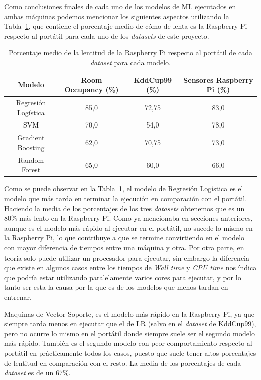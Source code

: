 \documentclass[a4paper, 12pt]{book}
\begin{document}
Como conclusiones finales de cada uno de los modelos de ML ejecutados en ambas máquinas podemos mencionar los siguientes aspectos utilizando la Tabla~\ref{tab:mean_per}, que contiene el porcentaje medio de cómo de lenta es la Raspberry Pi respecto al portátil para cada uno de los \textit{datasets} de este proyecto.

\begin{table}[htb]
\renewcommand{\arraystretch}{1.5}
\begin{adjustbox}{width=\textwidth}
\centering
    \begin{tabular}{c  c  c  c}
    \toprule
    Modelo & Room Occupancy (\%) & KddCup99 (\%) & Sensores Raspberry Pi (\%)\\
    \midrule
     Regresión Logística & 85,0 & 72,75 & 83,0\\
     SVM & 70,0 & 54,0 & 78,0\\
     Gradient Boosting & 62,0 & 70,75 & 73,0\\
     Random Forest & 65,0 & 60,0 & 66,0\\
    \bottomrule
    \end{tabular}
\end{adjustbox}
\caption{Porcentaje medio de la lentitud de la Raspberry Pi respecto al portátil de cada \textit{dataset} para cada modelo.}
\label{tab:mean_per}
\end{table}

Como se puede observar en la Tabla~\ref{tab:mean_per}, el modelo de Regresión Logística es el modelo que más tarda en terminar la ejecución en comparación con el portátil. Haciendo la media de los porcentajes de los tres \textit{datasets} obtenemos que es un $80\%$ más lento en la Raspberry Pi. Como ya mencionaba en secciones anteriores, aunque es el modelo más rápido al ejecutar en el portátil, no sucede lo mismo en la Raspberry Pi, lo que contribuye a que se termine convirtiendo en el modelo con mayor diferencia de tiempos entre una máquina y otra. Por otra parte, en teoría solo puede utilizar un procesador para ejecutar, sin embargo la diferencia que existe en algunos casos entre los tiempos de \textit{Wall time} y \textit{CPU time} nos índica que podría estar utilizando paralelamente varios cores para ejecutar, y por lo tanto ser esta la causa por la que es de los modelos que menos tardan en entrenar.

Maquinas de Vector Soporte, es el modelo más rápido en la Raspberry Pi, ya que siempre tarda menos en ejecutar que el de LR (salvo en el \textit{dataset} de KddCup99), pero no ocurre lo mismo en el portátil donde siempre suele ser el segundo modelo más rápido. También es el segundo modelo con peor comportamiento respecto al portátil en prácticamente todos los casos, puesto que suele tener altos porcentajes de lentitud en comparación con el resto. La media de los porcentajes de cada \textit{dataset} es de un $67\%$.
\end{document}
